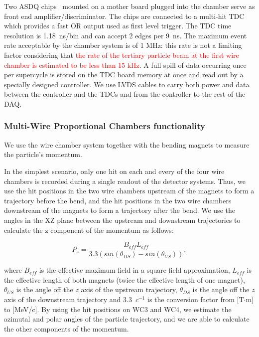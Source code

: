 Two ASDQ chips~\cite{ASDQchip} mounted on a mother board plugged into the chamber serve as front end amplifier/discriminator. The chips are connected to a multi-hit TDC~\cite{Sten} which provides a fast OR output used as first level trigger. The TDC time resolution is 1.18~ns/bin and can accept 2 edges per 9~ns.  
The maximum event rate acceptable by the chamber system is of 1 MHz: this rate is not a limiting factor considering that \textcolor{red}{the rate of the tertiary particle beam at the first wire chamber is estimated to be less than 15 kHz}. A full spill of data occurring once per supercycle is stored on the TDC board memory at once and read out by a specially designed controller.  We use LVDS cables to carry both power and data between the controller and the TDCs and from the controller to the rest of the DAQ.  

\subsubsection{Multi-Wire Proportional Chambers functionality}\label{sec:MWPCfunc}
We use the wire chamber system together with the bending magnets to measure the particle's momentum.

In the simplest scenario, only one hit on each and every of the four wire chambers is recorded during a single readout of the detector systems.  Thus, we use the hit positions in the two wire chambers upstream of the magnets to form a trajectory before the bend, and the hit positions in the two wire chambers downstream of the magnets to form a trajectory after the bend. We use the angles in the XZ plane between the upstream and downstream trajectories  to calculate the z component of the momentum as follows:

\begin{equation}
P_z=\frac{B_{eff}L_{eff}}{3.3(sin(\theta_{DS})-sin(\theta_{US}))},
\label{eq:momformula}
\end{equation}

where $B_{eff}$ is the effective maximum field in a square field approximation,  $L_{eff}$ is the effective length of both magnets (twice the effective length of one magnet), $\theta_{US}$ is the angle off the $z$ axis of the upstream trajectory, $\theta_{DS}$ is the angle off the $z$ axis of the downstream trajectory  and  3.3~$c^{-1}$ is the conversion factor from [T$\cdot$m] to [MeV/c]. By using the hit positions on WC3 and WC4, we estimate the azimutal and polar angles of the particle trajectory, and we are able to calculate the other components of the momentum. 

